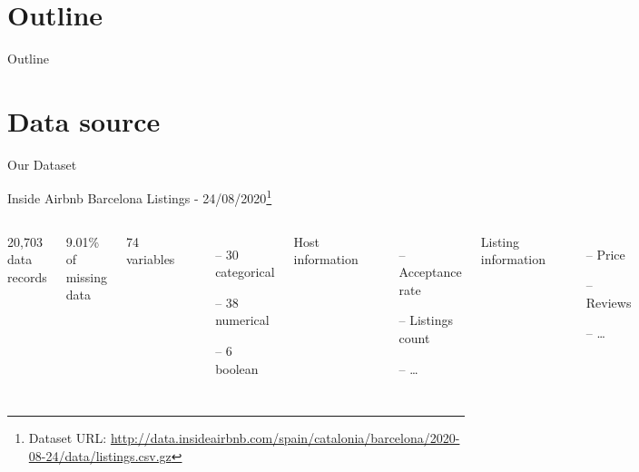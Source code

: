\section{Outline}
\begin{frame}{Outline}
\begin{scriptsize}
    \vspace{1.5em}
    \tableofcontents
\end{scriptsize}
\end{frame}

\section{Data source}
\begin{frame}{Our Dataset}
\begin{center}
    Inside Airbnb Barcelona Listings - 24/08/2020\footnote[frame]{Dataset URL: \url{http://data.insideairbnb.com/spain/catalonia/barcelona/2020-08-24/data/listings.csv.gz}}
\vspace{5 mm}

\begin{columns}[t]
    20,703 data records

    9.01\% of missing data

    74 variables
    \small
    \begin{itemize}[topsep=0pt]
        \itemsep-0.25em
    	\item[--] 30 categorical
    	\item[--] 38 numerical
    	\item[--] 6 boolean
    \end{itemize}
    \normalsize

    Host information
    \small
    \begin{itemize}[topsep=0pt]
        \itemsep-0.5em
    	\item[--] Acceptance rate
    	\item[--] Listings count
    	\item[--] \dots
    \end{itemize}
    \normalsize
    Listing information
    \small
    \begin{itemize}[topsep=0pt]
        \itemsep-0.5em
    	\item[--] Price
    	\item[--] Reviews
    	\item[--] \dots
    \end{itemize}
    \normalsize
\end{columns}

\end{center}
\end{frame}


